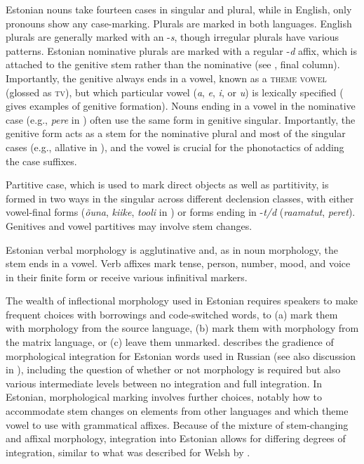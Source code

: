 \documentclass[output=paper]{langscibook}
\begin{document}
Estonian nouns take fourteen cases in singular and plural, while in English, only pronouns show any case-marking. Plurals are marked in both languages. English plurals are generally marked with an -\textit{s}, though irregular plurals have various patterns. Estonian nominative plurals are marked with a regular -\textit{d} affix, which is attached to the genitive stem rather than the nominative (see , final column). Importantly, the genitive always ends in a vowel, known as a \textsc{theme} \textsc{vowel} (glossed as \textsc{tv),} but which particular vowel (\textit{a}, \textit{e}, \textit{i}, or \textit{u}) is lexically specified ( gives examples of genitive formation). Nouns ending in a vowel in the nominative case (e.g., \textit{pere} in ) often use the same form in genitive singular. Importantly, the genitive form acts as a stem for the nominative plural and most of the singular cases (e.g., allative in ), and the vowel is crucial for the phonotactics of adding the case suffixes.

Partitive case, which is used to mark direct objects as well as partitivity, is formed in two ways in the singular across different declension classes, with either vowel-final forms (\textit{õuna}, \textit{kiike}, \textit{tooli} in ) or forms ending in -\textit{t/d} (\textit{raamatut}, \textit{peret}). Genitives and vowel partitives may involve stem changes.

Estonian verbal morphology is agglutinative and, as in noun morphology, the stem ends in a vowel. Verb affixes mark tense, person, number, mood, and voice in their finite form or receive various infinitival markers.

The wealth of inflectional morphology used in Estonian requires speakers to make frequent choices with borrowings and code-switched words, to (a) mark them with morphology from the source language, (b) mark them with morphology from the matrix language, or (c) leave them unmarked. \citet{Zabrodskaja2009} describes the gradience of morphological integration for Estonian words used in Russian (see also discussion in \citealt{Vihman2016, Kask2019}), including the question of whether or not morphology is required but also various intermediate levels between no integration and full integration. In Estonian, morphological marking involves further choices, notably how to accommodate stem changes on elements from other languages and which theme vowel to use with grammatical affixes. Because of the mixture of stem-changing and affixal morphology, integration into Estonian allows for differing degrees of integration, similar to what was described for Welsh by \citet{Deuchar2020}.
\end{document}
